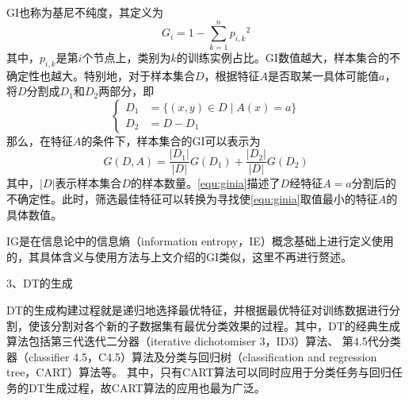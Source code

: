 GI也称为基尼不纯度，其定义为
\begin{equation}
      \label{equ:gini}
      G_i = 1 - \sum_{k=1}^n{p_{i,k}}^2
\end{equation}
其中，$p_{i,k}$是第$i$个节点上，类别为$k$的训练实例占比。GI数值越大，样本集合的不确定性也越大。特别地，对于样本集合$D$，根据特征$A$是否取某一具体可能值$a$，将$D$分割成$D_1$和$D_2$两部分，即
\begin{equation}
      \label{equ:daset}
      \left \{
      \begin{aligned}
            D_1 &= \{ (x,y) \in D \mid A(x) = a\} \\
            D_2 &= D - D_1
      \end{aligned}
      \right.
      \end{equation}
那么，在特征$A$的条件下，样本集合的GI可以表示为
\begin{equation}
      \label{equ:ginia}
      G(D,A) = \frac{|D_1|}{|D|}G(D_1) + \frac{|D_2|}{|D|}G(D_2)
\end{equation}
其中，$|D|$表示样本集合$D$的样本数量。\autoref{equ:ginia}描述了$D$经特征$A=a$分割后的不确定性。此时，筛选最佳特征可以转换为寻找使\autoref{equ:ginia}取值最小的特征$A$的具体数值。

IG是在信息论中的信息熵（information entropy，IE）概念基础上进行定义使用的，其具体含义与使用方法与上文介绍的GI类似，这里不再进行赘述\cite{Zhou2016,Li2017}。

3、DT的生成

DT的生成构建过程就是递归地选择最优特征，并根据最优特征对训练数据进行分割，使该分割对各个新的子数据集有最优分类效果的过程。其中，DT的经典生成算法包括第三代迭代二分器（iterative dichotomiser 3，ID3）算法、
第4.5代分类器（classifier 4.5，C4.5）算法及分类与回归树（classification and regression tree，CART）算法等\cite{quinlan1986,quinlan1993,breiman1984}。
其中，只有CART算法可以同时应用于分类任务与回归任务的DT生成过程，故CART算法的应用也最为广泛。


